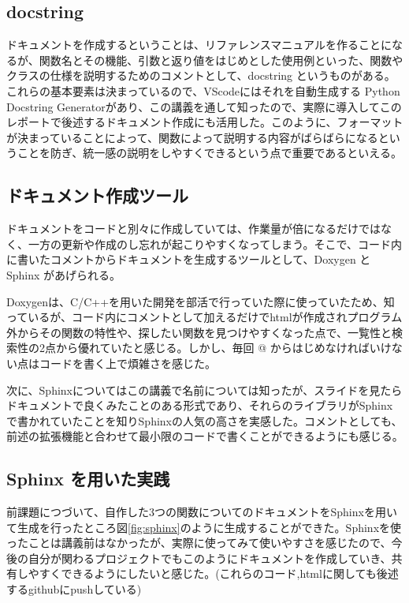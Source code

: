 \documentclass[12pt]{jsarticle}
\begin{document}
\subsection{docstring}
ドキュメントを作成するということは、リファレンスマニュアルを作ることになるが、関数名とその機能、引数と返り値をはじめとした使用例といった、関数やクラスの仕様を説明するためのコメントとして、docstring というものがある。これらの基本要素は決まっているので、VScodeにはそれを自動生成する Python Docstring Generatorがあり、この講義を通して知ったので、実際に導入してこのレポートで後述するドキュメント作成にも活用した。このように、フォーマットが決まっていることによって、関数によって説明する内容がばらばらになるということを防ぎ、統一感の説明をしやすくできるという点で重要であるといえる。

\subsection{ドキュメント作成ツール}
ドキュメントをコードと別々に作成していては、作業量が倍になるだけではなく、一方の更新や作成のし忘れが起こりやすくなってしまう。そこで、コード内に書いたコメントからドキュメントを生成するツールとして、Doxygen と Sphinx があげられる。

Doxygenは、C/C++を用いた開発を部活で行っていた際に使っていたため、知っているが、コード内にコメントとして加えるだけでhtmlが作成されプログラム外からその関数の特性や、探したい関数を見つけやすくなった点で、一覧性と検索性の2点から優れていたと感じる。しかし、毎回 @ からはじめなければいけない点はコードを書く上で煩雑さを感じた。

次に、Sphinxについてはこの講義で名前については知ったが、スライドを見たらドキュメントで良くみたことのある形式であり、それらのライブラリがSphinxで書かれていたことを知りSphinxの人気の高さを実感した。コメントとしても、前述の拡張機能と合わせて最小限のコードで書くことができるようにも感じる。

\subsection{Sphinx を用いた実践}
前課題につづいて、自作した3つの関数についてのドキュメントをSphinxを用いて生成を行ったところ図\ref{fig:sphinx}のように生成することができた。Sphinxを使ったことは講義前はなかったが、実際に使ってみて使いやすさを感じたので、今後の自分が関わるプロジェクトでもこのようにドキュメントを作成していき、共有しやすくできるようにしたいと感じた。(これらのコード,htmlに関しても後述するgithubにpushしている)
\end{document}
